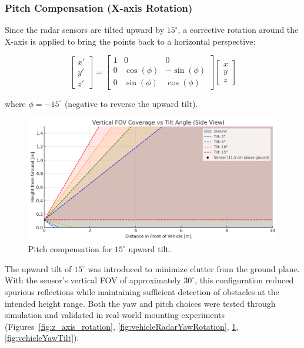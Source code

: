 \vspace{0.5em}
\subsubsection{Pitch Compensation (X-axis Rotation)}
Since the radar sensors are tilted upward by $15^\circ$, a corrective rotation around the X-axis is applied to bring the points back to a horizontal perspective: 

\[
\begin{bmatrix}
x' \\ y' \\ z'
\end{bmatrix}
=
\begin{bmatrix}
1 & 0 & 0 \\
0 & \cos(\phi) & -\sin(\phi) \\
0 & \sin(\phi) & \cos(\phi)
\end{bmatrix}
\begin{bmatrix}
x \\ y \\ z
\end{bmatrix}
\]

where $\phi = -15^\circ$ (negative to reverse the upward tilt).

\begin{figure}[!htbp]
    \centering
    \includegraphics[width=0.8\linewidth]{images/TiltSensor.png}
    \caption{Pitch compensation for $15^\circ$ upward tilt.}
    \label{fig:x_axis_rotation}
\end{figure}

The upward tilt of $15^\circ$ was introduced to minimize clutter from the ground plane.  
With the sensor's vertical FOV of approximately $30^\circ$, this configuration reduced spurious reflections while maintaining sufficient detection of obstacles at the intended height range.  
Both the yaw and pitch choices were tested through simulation and validated in real-world mounting experiments (Figures~\ref{fig:z_axis_rotation}, \ref{fig:vehicleRadarYawRotation}, \ref{fig:x_axis_rotation}, \ref{fig:vehicleYawTilt}).

